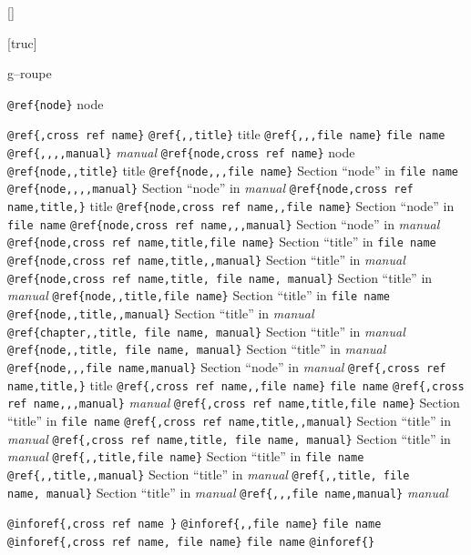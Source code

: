 \documentclass{book}
\begin{document}
\begin{titlepage}
\noindent\texttt{}\hfill[]



\noindent\texttt{}\hfill[truc]




g--roupe

\texttt{@ref\{node\}} node

\texttt{@ref\{,cross ref name\}} 
\texttt{@ref\{{,}{,}title\}} title
\texttt{@ref\{{,}{,},file name\}} \texttt{file name}
\texttt{@ref\{{,}{,}{,}{,}manual\}} \textsl{manual}
\texttt{@ref\{node,cross ref name\}} node
\texttt{@ref\{node{,}{,}title\}} title
\texttt{@ref\{node{,}{,},file name\}} Section ``node'' in \texttt{file name}
\texttt{@ref\{node{,}{,}{,}{,}manual\}} Section ``node'' in \textsl{manual}
\texttt{@ref\{node,cross ref name,title,\}} title
\texttt{@ref\{node,cross ref name{,}{,}file name\}} Section ``node'' in \texttt{file name}
\texttt{@ref\{node,cross ref name{,}{,},manual\}} Section ``node'' in \textsl{manual}
\texttt{@ref\{node,cross ref name,title,file name\}} Section ``title'' in \texttt{file name}
\texttt{@ref\{node,cross ref name,title{,}{,}manual\}} Section ``title'' in \textsl{manual}
\texttt{@ref\{node,cross ref name,title,\ file name,\ manual\}} Section ``title'' in \textsl{manual}
\texttt{@ref\{node{,}{,}title,file name\}} Section ``title'' in \texttt{file name}
\texttt{@ref\{node{,}{,}title{,}{,}manual\}} Section ``title'' in \textsl{manual}
\texttt{@ref\{chapter{,}{,}title,\ file name,\ manual\}} Section ``title'' in \textsl{manual}
\texttt{@ref\{node{,}{,}title,\ file name,\ manual\}} Section ``title'' in \textsl{manual}
\texttt{@ref\{node{,}{,},file name,manual\}} Section ``node'' in \textsl{manual}
\texttt{@ref\{,cross ref name,title,\}} title
\texttt{@ref\{,cross ref name{,}{,}file name\}} \texttt{file name}
\texttt{@ref\{,cross ref name{,}{,},manual\}} \textsl{manual}
\texttt{@ref\{,cross ref name,title,file name\}} Section ``title'' in \texttt{file name}
\texttt{@ref\{,cross ref name,title{,}{,}manual\}} Section ``title'' in \textsl{manual}
\texttt{@ref\{,cross ref name,title,\ file name,\ manual\}} Section ``title'' in \textsl{manual}
\texttt{@ref\{{,}{,}title,file name\}} Section ``title'' in \texttt{file name}
\texttt{@ref\{{,}{,}title{,}{,}manual\}} Section ``title'' in \textsl{manual}
\texttt{@ref\{{,}{,}title,\ file name,\ manual\}} Section ``title'' in \textsl{manual}
\texttt{@ref\{{,}{,},file name,manual\}} \textsl{manual}

\texttt{@inforef\{,cross ref name \}} 
\texttt{@inforef\{{,}{,}file name\}} \texttt{file name}
\texttt{@inforef\{,cross ref name,\ file name\}} \texttt{file name}
\texttt{@inforef\{\}} 




\end{titlepage}
\end{document}
